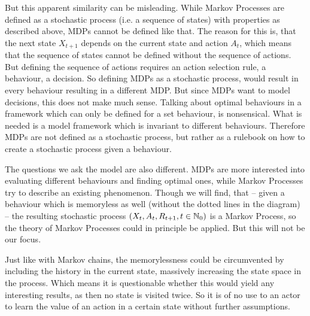 But this apparent similarity can be misleading. While Markov Processes are defined as a stochastic process (i.e. a sequence of states) with properties as described above, MDPs cannot be defined like that. The reason for this is, that the next state \(X_{t+1}\) depends on the current state and action \(A_{t}\), which means that the sequence of states cannot be defined without the sequence of actions. But defining the sequence of actions requires an action selection rule, a behaviour, a decision. So defining MDPs as a stochastic process, would result in every behaviour resulting in a different MDP. But since MDPs want to model decisions, this does not make much sense. Talking about optimal behaviours in a framework which can only be defined for a set behaviour, is nonsensical. What is needed is a model framework which is invariant to different behaviours. Therefore MDPs are not defined as a stochastic process, but rather as a rulebook on how to create a stochastic process given a behaviour. 

The questions we ask the model are also different.  MDPs are more interested into evaluating different behaviours and finding optimal ones, while Markov Processes try to describe an existing phenomenon. Though we will find, that -- given a behaviour which is memoryless as well (without the dotted lines in the diagram) -- the resulting stochastic process \((X_t,A_t,R_{t+1},t\in\mathbb{N}_0)\) is a Markov Process, so the theory of Markov Processes could in principle be applied. But this will not be our focus. 

Just like with Markov chains, the memorylessness could be circumvented by including the history in the current state, massively increasing the state space in the process. Which means it is questionable whether this would yield any interesting results, as then no state is visited twice. So it is of no use to an actor to learn the value of an action in a certain state without further assumptions.

